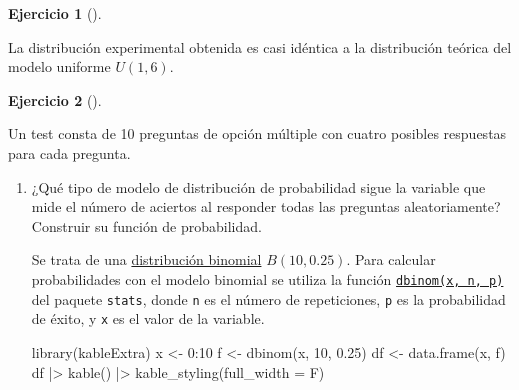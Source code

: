 \documentclass[
  a4paper,
]{scrreport}
\newenvironment{Shaded}{\begin{snugshade}}{\end{snugshade}}
\newcommand{\AttributeTok}[1]{\textcolor[rgb]{0.40,0.45,0.13}{#1}}
\newcommand{\DecValTok}[1]{\textcolor[rgb]{0.68,0.00,0.00}{#1}}
\newcommand{\FloatTok}[1]{\textcolor[rgb]{0.68,0.00,0.00}{#1}}
\newcommand{\FunctionTok}[1]{\textcolor[rgb]{0.28,0.35,0.67}{#1}}
\newcommand{\NormalTok}[1]{\textcolor[rgb]{0.00,0.23,0.31}{#1}}
\newcommand{\OtherTok}[1]{\textcolor[rgb]{0.00,0.23,0.31}{#1}}
\newcommand{\SpecialCharTok}[1]{\textcolor[rgb]{0.37,0.37,0.37}{#1}}
\theoremstyle{definition}
\newtheorem{exercise}{Ejercicio}[chapter]
\theoremstyle{remark}
\begin{document}
\begin{exercise}[]
\begin{enumerate}
\begin{tcolorbox}
  La distribución experimental obtenida es casi idéntica a la
  distribución teórica del modelo uniforme \(U(1,6)\).

  \end{tcolorbox}
\end{enumerate}

\end{exercise}

\begin{exercise}[]\protect\hypertarget{exr-distribuciones-probabilidad-2}{}\label{exr-distribuciones-probabilidad-2}

Un test consta de 10 preguntas de opción múltiple con cuatro posibles
respuestas para cada pregunta.

\begin{enumerate}
\def\labelenumi{\alph{enumi}.}
\item
  ¿Qué tipo de modelo de distribución de probabilidad sigue la variable
  que mide el número de aciertos al responder todas las preguntas
  aleatoriamente? Construir su función de probabilidad.

  \begin{tcolorbox}[enhanced jigsaw, toprule=.15mm, rightrule=.15mm, arc=.35mm, colback=white, colbacktitle=quarto-callout-tip-color!10!white, toptitle=1mm, left=2mm, colframe=quarto-callout-tip-color-frame, opacityback=0, breakable, opacitybacktitle=0.6, bottomtitle=1mm, titlerule=0mm, title=\textcolor{quarto-callout-tip-color}{\faLightbulb}\hspace{0.5em}{Solución}, bottomrule=.15mm, coltitle=black, leftrule=.75mm]

  Se trata de una
  \href{https://es.wikipedia.org/wiki/Distribuci\%C3\%B3n_binomial}{distribución
  binomial} \(B(10, 0.25)\). Para calcular probabilidades con el modelo
  binomial se utiliza la función
  \href{https://www.rdocumentation.org/packages/stats/versions/3.3/topics/Binomial}{\texttt{dbinom(x,\ n,\ p)}}
  del paquete \texttt{stats}, donde \texttt{n} es el número de
  repeticiones, \texttt{p} es la probabilidad de éxito, y \texttt{x} es
  el valor de la variable.

\begin{Shaded}
\begin{Highlighting}[]
\FunctionTok{library}\NormalTok{(kableExtra)}
\NormalTok{x }\OtherTok{\textless{}{-}} \DecValTok{0}\SpecialCharTok{:}\DecValTok{10}
\NormalTok{f }\OtherTok{\textless{}{-}} \FunctionTok{dbinom}\NormalTok{(x, }\DecValTok{10}\NormalTok{, }\FloatTok{0.25}\NormalTok{)}
\NormalTok{df }\OtherTok{\textless{}{-}} \FunctionTok{data.frame}\NormalTok{(x, f)}
\NormalTok{df }\SpecialCharTok{|\textgreater{}} 
    \FunctionTok{kable}\NormalTok{() }\SpecialCharTok{|\textgreater{}} 
    \FunctionTok{kable\_styling}\NormalTok{(}\AttributeTok{full\_width =}\NormalTok{ F)}
\end{Highlighting}
\end{Shaded}


\end{tcolorbox}
\end{enumerate}
\end{exercise}
\end{document}

